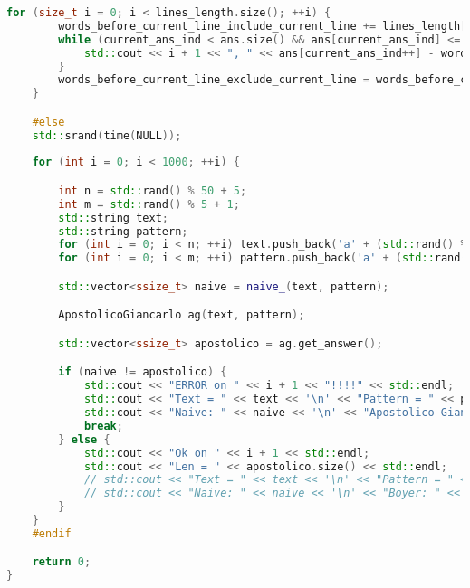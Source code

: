 \begin{lstlisting}[language=C++]
    for (size_t i = 0; i < lines_length.size(); ++i) {
        words_before_current_line_include_current_line += lines_length[i];
        while (current_ans_ind < ans.size() && ans[current_ans_ind] <= words_before_current_line_include_current_line) {
            std::cout << i + 1 << ", " << ans[current_ans_ind++] - words_before_current_line_exclude_current_line << '\n';
        }
        words_before_current_line_exclude_current_line = words_before_current_line_include_current_line;
    }

    #else
    std::srand(time(NULL));
    
    for (int i = 0; i < 1000; ++i) {

        int n = std::rand() % 50 + 5;
        int m = std::rand() % 5 + 1;
        std::string text;
        std::string pattern;
        for (int i = 0; i < n; ++i) text.push_back('a' + (std::rand() % 5));
        for (int i = 0; i < m; ++i) pattern.push_back('a' + (std::rand() % 5));

        std::vector<ssize_t> naive = naive_(text, pattern);

        ApostolicoGiancarlo ag(text, pattern);

        std::vector<ssize_t> apostolico = ag.get_answer();

        if (naive != apostolico) {
            std::cout << "ERROR on " << i + 1 << "!!!!" << std::endl;
            std::cout << "Text = " << text << '\n' << "Pattern = " << pattern << std::endl;
            std::cout << "Naive: " << naive << '\n' << "Apostolico-Giancarlo: " << apostolico << std::endl;
            break;
        } else {
            std::cout << "Ok on " << i + 1 << std::endl;
            std::cout << "Len = " << apostolico.size() << std::endl;
            // std::cout << "Text = " << text << '\n' << "Pattern = " << pattern << std::endl;
            // std::cout << "Naive: " << naive << '\n' << "Boyer: " << boyer << std::endl;
        }
    }
    #endif

    return 0;
}
\end{lstlisting}

